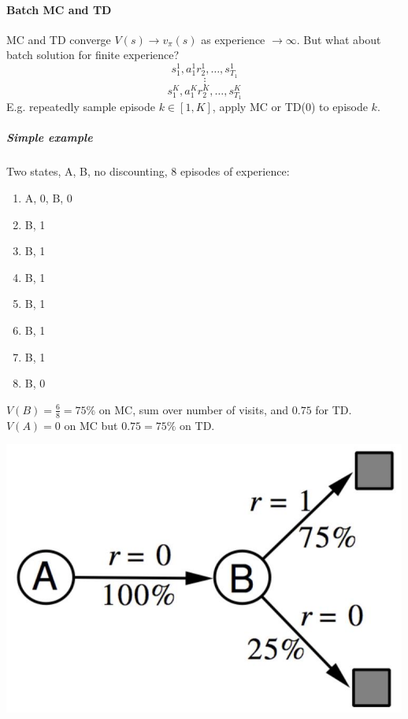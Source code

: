 \documentclass[10pt]{report}
\begin{document}
\paragraph{Batch MC and TD} MC and TD converge $V(s) \rightarrow v_\pi(s)$ as experience $\rightarrow \infty$. But what about batch solution for finite experience?
$$s_1^1,a_1^1r_2^1,\ldots,s_{T_1}^1$$
$$\vdots$$
$$s_1^K,a_1^Kr_2^K,\ldots,s_{T_1}^K$$
E.g. repeatedly sample episode $k\in [1,K]$, apply MC or TD(0) to episode $k$.
\subparagraph{Simple example} 
\begin{multicols}{2}
Two states, A, B, no discounting, 8 episodes of experience:
\begin{enumerate}
	\item A, 0, B, 0
	\item B, 1
	\item B, 1
	\item B, 1
	\item B, 1
	\item B, 1
	\item B, 1
	\item B, 0
\end{enumerate}
$V(B)=\frac{6}{8}=75\%$ on MC, sum over number of visits, and $0.75$ for TD.\\
$V(A)=0$ on MC but $0.75=75\%$ on TD.
\columnbreak
\begin{center}
	\includegraphics[scale=0.5]{174.png}
\end{center}
\end{multicols}
\end{document}
